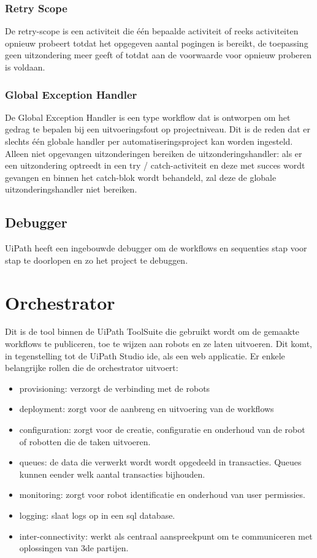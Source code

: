 \subsubsection{Retry Scope}
De retry-scope is een activiteit die één bepaalde activiteit of reeks activiteiten opnieuw probeert totdat het opgegeven aantal pogingen is bereikt, de toepassing geen uitzondering meer geeft of totdat aan de voorwaarde voor opnieuw proberen is voldaan.

\subsubsection{Global Exception Handler}
De Global Exception Handler is een type workflow dat is ontworpen om het gedrag te bepalen bij een uitvoeringsfout op projectniveau. Dit is de reden dat er slechts één globale handler per automatiseringsproject kan worden ingesteld. Alleen niet opgevangen uitzonderingen bereiken de uitzonderingshandler: als er een uitzondering optreedt in een try / catch-activiteit en deze met succes wordt gevangen en binnen het catch-blok wordt behandeld, zal deze de globale uitzonderingshandler niet bereiken.

\subsection{Debugger}
UiPath heeft een ingebouwde debugger om de workflows en sequenties stap voor stap te doorlopen en zo het project te debuggen.

\section{Orchestrator}
Dit is de tool binnen de UiPath ToolSuite die gebruikt wordt om de gemaakte workflows te publiceren, toe te wijzen aan robots en ze laten uitvoeren. Dit komt, in tegenstelling tot de UiPath Studio ide, als een web applicatie. Er enkele belangrijke rollen die de orchestrator uitvoert:
\begin{itemize}
	\item provisioning: verzorgt de verbinding met de robots
	\item deployment: zorgt voor de aanbreng en uitvoering van de workflows
	\item configuration: zorgt voor de creatie, configuratie en onderhoud van de robot of robotten die de taken uitvoeren.
	\item queues: de data die verwerkt wordt wordt opgedeeld in transacties. Queues kunnen eender welk aantal transacties bijhouden.
	\item monitoring: zorgt voor robot identificatie en onderhoud van user permissies.
	\item logging: slaat logs op in een sql database.
	\item inter-connectivity: werkt als centraal aanspreekpunt om te communiceren met oplossingen van 3de partijen.
\end{itemize}

